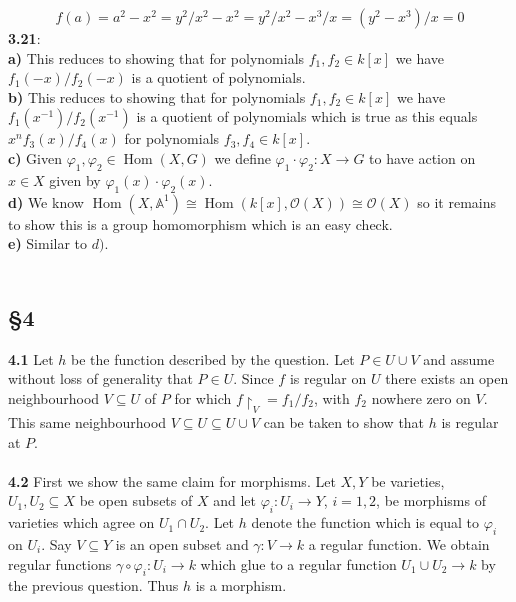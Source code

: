 \documentclass[12pt]{article}
\numberwithin{thm}{subsection}
\numberwithin{defn}{subsection}
\numberwithin{lemma}{subsection}
\numberwithin{example}{subsection}
\numberwithin{notation}{subsection}
\numberwithin{cor}{subsection}
\numberwithin{remark}{subsection}
\numberwithin{condition}{subsection}
\numberwithin{question}{subsection}
\numberwithin{construction}{subsection}
\numberwithin{construction}{subsection}
\numberwithin{construction}{subsection}
\newcommand{\bb}[1]{\mathbb{#1}}
\newcommand{\call}[1]{\mathcal{#1}}
\newcommand{\lto}{\longrightarrow}
\begin{document}
\[f(a) = a^2 - x^2 = y^2/x^2 - x^2 = y^2/x^2 - x^3/x = (y^2 - x^3)/x = 0\]
\textbf{3.21}:\\
\textbf{a)} This reduces to showing that for polynomials $f_1,f_2 \in k[x]$ we have $f_1(-x)/f_2(-x)$ is a quotient of polynomials.\\
\textbf{b)} This reduces to showing that for polynomials $f_1,f_2 \in k[x]$ we have $f_1(x^{-1})/f_2(x^{-1})$ is a quotient of polynomials which is true as this equals $x^n f_3(x)/f_4(x)$ for polynomials $f_3,f_4 \in k[x]$.\\
\textbf{c)} Given $\varphi_1,\varphi_2 \in \operatorname{Hom}(X,G)$ we define $\varphi_1\cdot\varphi_2: X \to G$ to have action on $x \in X$ given by $\varphi_1(x)\cdot\varphi_2(x)$.\\
\textbf{d)} We know $\operatorname{Hom}(X,\bb{A}^1) \cong \operatorname{Hom}(k[x], \call{O}(X)) \cong \call{O}(X)$ so it remains to show this is a group homomorphism which is an easy check.\\
\textbf{e)} Similar to $d)$.\\\\
%
\subsection{\S 4}
\textbf{4.1} Let $h$ be the function described by the question. Let $P \in U \cup V$ and assume without loss of generality that $P \in U$. Since $f$ is regular on $U$ there exists an open neighbourhood $V \subseteq U$ of $P$ for which $f\restriction_{V} = f_1/f_2$, with $f_2$ nowhere zero on $V$. This same neighbourhood $V \subseteq U \subseteq U \cup V$ can be taken to show that $h$ is regular at $P$.\\\\
%
\textbf{4.2} First we show the same claim for morphisms. Let $X,Y$ be varieties, $U_1,U_2 \subseteq X$ be open subsets of $X$ and let $\varphi_i: U_i \lto Y$, $i = 1,2$, be morphisms of varieties which agree on $U_1 \cap U_2$. Let $h$ denote the function which is equal to $\varphi_i$ on $U_i$. Say $V \subseteq Y$ is an open subset and $\gamma: V \lto k$ a regular function. We obtain regular functions $\gamma \circ \varphi_i: U_i \lto k$ which glue to a regular function $U_1 \cup U_2 \lto k$ by the previous question. Thus $h$ is a morphism.
\end{document}
